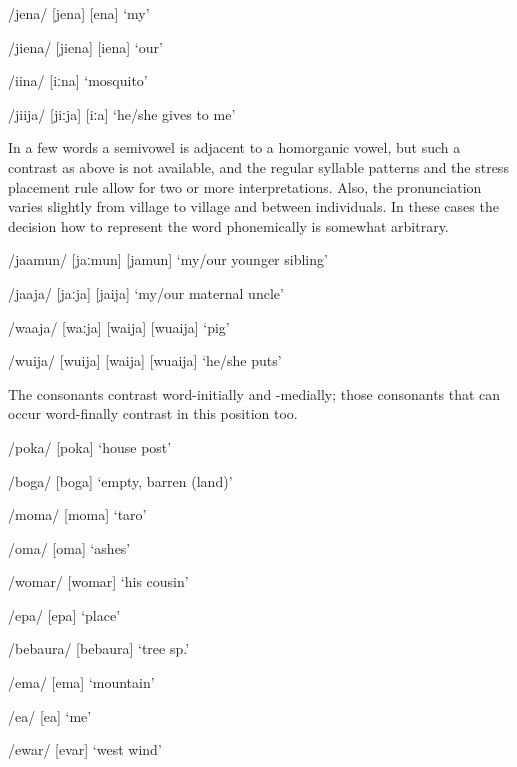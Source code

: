 /jena/  [je{{\textprimstress}na}] {\Tilde} [{\textyogh}e{{\textprimstress}na}]  `my'

/jiena/  [ji{{\textprimstress}ena}] {\Tilde} [{\textyogh}i{{\textprimstress}ena}]  `our'

/iina/  [{{\textprimstress}iːna}]  `mosquito'

/jiija/  [{{\textprimstress}jiːja}] {\Tilde} [{{\textprimstress}}{\textyogh}iː{\textyogh}a]  `he/she gives to me'

In a few words a semivowel is adjacent to a homorganic vowel, but such a contrast as above is not available, and the regular syllable patterns and the stress placement rule allow for two or more interpretations. Also, the pronunciation varies slightly from village to village and between individuals.  In these cases the decision how to represent the word phonemically is somewhat arbitrary.

/jaamun/  [{{\textprimstress}jaːmun}] {\Tilde} [j{\textsci{{\textprimstress}}}amun]  `my/our younger sibling'

/jaaja/  [{{\textprimstress}jaːja}] {\Tilde} [{{\textprimstress}jaija}]  `my/our maternal uncle'

/waaja/  [{{\textprimstress}waːja}] {\Tilde} [{{\textprimstress}waija}] {\Tilde} [{{\textprimstress}wuaija}]  `pig'

/wuija/  [{{\textprimstress}wuija}] {\Tilde} [{{\textprimstress}waija}] {\Tilde} [{{\textprimstress}wuaija}]  `he/she puts'

The  consonants contrast word-initially and -medially; those consonants that can occur word-finally contrast in this position too. 

/poka/  [po{{\textprimstress}ka}]  `house post'

/boga/  [bo{{\textprimstress}ga}]  `empty, barren (land)'

/moma/  [mo{{\textprimstress}ma}]  `taro'

/{\textphi}oma/  [{\textphi}o{{\textprimstress}ma}]  `ashes'

/womar/  [wo{{\textprimstress}mar}]  `his cousin'

/epa/  [e{{\textprimstress}pa}]  `place'

/bebaura/  [be{{\textprimstress}baura}]  `tree sp.'

/ema/  [e{{\textprimstress}ma}]  `mountain'

/e{\textphi}a/  [e{{\textprimstress}}{\textphi}a]  `me'

/ewar/  [e{{\textprimstress}var}]  `west wind'

